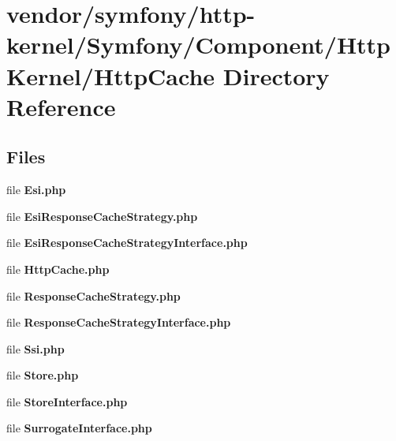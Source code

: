 \section{vendor/symfony/http-\/kernel/\+Symfony/\+Component/\+Http\+Kernel/\+Http\+Cache Directory Reference}
\label{dir_bd1d830272a3377b5342a63a6a43bfcf}
\subsection*{Files}
\begin{DoxyCompactItemize}
\item 
file {\bf Esi.\+php}
\item 
file {\bf Esi\+Response\+Cache\+Strategy.\+php}
\item 
file {\bf Esi\+Response\+Cache\+Strategy\+Interface.\+php}
\item 
file {\bf Http\+Cache.\+php}
\item 
file {\bf Response\+Cache\+Strategy.\+php}
\item 
file {\bf Response\+Cache\+Strategy\+Interface.\+php}
\item 
file {\bf Ssi.\+php}
\item 
file {\bf Store.\+php}
\item 
file {\bf Store\+Interface.\+php}
\item 
file {\bf Surrogate\+Interface.\+php}
\end{DoxyCompactItemize}

